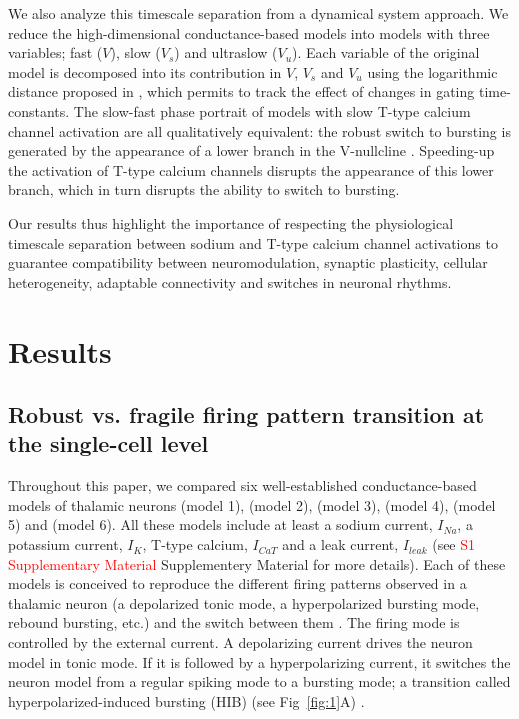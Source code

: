 We also analyze this timescale separation from a dynamical system approach. We reduce the high-dimensional conductance-based models into models with three variables; fast ($V$), slow ($V_s$) and ultraslow ($V_u$).  Each variable of the original model is decomposed into its contribution in $V$, $V_s$ and $V_u$ using the logarithmic distance proposed in \citep{drion_dynamic_2015}, which permits to track the effect of changes in gating time-constants.  The slow-fast phase portrait of models with slow T-type calcium channel activation are all qualitatively equivalent: the robust switch to bursting is generated by the appearance of a lower branch in the V-nullcline  \citep{franci_balance_2013, franci_modeling_2014, franci_robust_2018, van_pottelbergh_robust_2018}. Speeding-up the activation of T-type calcium channels disrupts the appearance of this lower branch, which in turn disrupts the ability to switch to bursting.


Our results thus highlight the importance of respecting the physiological timescale separation between sodium and T-type calcium channel activations to guarantee compatibility between neuromodulation, synaptic plasticity, cellular heterogeneity, adaptable connectivity and switches in neuronal rhythms. 

\section{Results}
\subsection{Robust vs. fragile firing pattern transition at the single-cell level}
Throughout this paper, we compared six well-established conductance-based models of thalamic neurons \citep{drion_switchable_2018} (model 1), \citep{destexhe_vivo_1996} (model 2), \citep{destexhe_dendritic_1998} (model 3), \citep{mccormick_model_1992} \citep{huguenard_simulation_1992} (model 4), \citep{wang_multiple_1994} (model 5) and \citep{rush_analysis_1994} (model 6). All these models include at least a sodium current, $I_{Na}$, a  potassium current, $I_K$, T-type calcium, $I_{CaT}$ and a leak current, $I_{leak}$ (see \textcolor{red}{S1 Supplementary Material} Supplementery Material for more details). Each of these models is conceived to reproduce the different firing patterns observed in a thalamic neuron (a depolarized tonic mode, a hyperpolarized bursting mode, rebound bursting, etc.) and the switch between them \citep{guillery_thalamic_2002, mccormick_sleep_1997, murray_sherman_tonic_2001, castro-alamancos_dynamics_2004}. The firing mode is controlled by the external current.  A depolarizing current drives the neuron model in tonic mode. If it is followed by a hyperpolarizing current, it switches the neuron model from a regular spiking mode to a bursting mode; a transition called hyperpolarized-induced bursting (HIB) (see Fig~\ref{fig:1}A) \citep{mccormick_sleep_1997}. 


